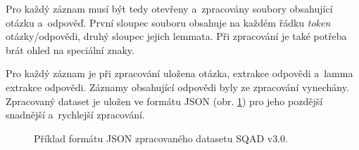 Pro každý záznam musí být tedy otevřeny a~zpracovány soubory obsahující otázku a~odpověď. První sloupec souboru obsahuje na každém řádku \emph{token} otázky/odpovědi, druhý sloupec jejich lemmata. Při zpracování je také potřeba brát ohled na speciální znaky.\par
Pro každý záznam je při zpracování uložena otázka, extrakce odpovědi a~lamma extrakce odpovědi. Záznamy obsahující  odpovědi byly ze zpracování vynechány. Zpracovaný dataset je uložen ve formátu JSON (obr. \ref{fig:sqad_processed}) pro jeho pozdější snadnější a~rychlejší zpracování.

\begin{figure}[hbt]
	\centering
	\caption{Příklad formátu JSON zpracovaného datasetu SQAD v3.0.}
	\label{fig:sqad_processed}
\end{figure}

